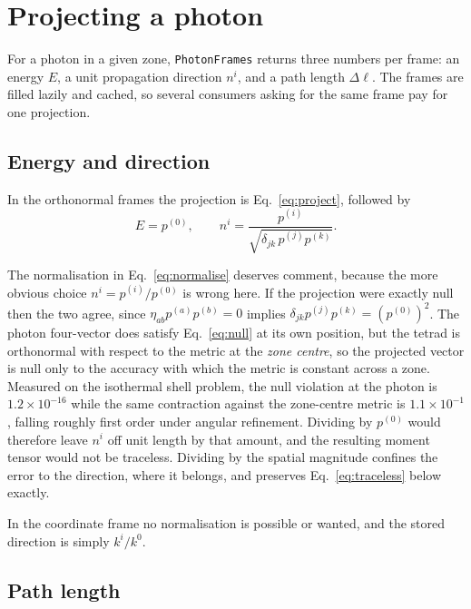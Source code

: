 \documentclass[11pt]{article}
\begin{document}
\section{Projecting a photon}
\label{sec:project}

For a photon in a given zone, \texttt{PhotonFrames} returns three numbers per frame: an
energy $E$, a unit propagation direction $n^i$, and a path length $\Delta \ell$. The
frames are filled lazily and cached, so several consumers asking for the same frame pay
for one projection.

\subsection{Energy and direction}

In the orthonormal frames the projection is Eq.~\eqref{eq:project}, followed by
\begin{equation}
  E = p^{(0)} , \qquad
  n^i = \frac{p^{(i)}}{\sqrt{\delta_{jk}\, p^{(j)} p^{(k)}}} .
  \label{eq:normalise}
\end{equation}

The normalisation in Eq.~\eqref{eq:normalise} deserves comment, because the more obvious
choice $n^i = p^{(i)}/p^{(0)}$ is wrong here. If the projection were exactly null then the
two agree, since $\eta_{ab} p^{(a)} p^{(b)} = 0$ implies
$\delta_{jk} p^{(j)} p^{(k)} = (p^{(0)})^2$. The photon four-vector does satisfy
Eq.~\eqref{eq:null} at its own position, but the tetrad is orthonormal with respect to the
metric at the \emph{zone centre}, so the projected vector is null only to the accuracy with
which the metric is constant across a zone. Measured on the isothermal shell problem, the
null violation at the photon is $1.2\times 10^{-16}$ while the same contraction against the
zone-centre metric is $1.1\times 10^{-1}$, falling roughly first order under angular
refinement. Dividing by $p^{(0)}$ would therefore leave $n^i$ off unit length by that
amount, and the resulting moment tensor would not be traceless. Dividing by the spatial
magnitude confines the error to the direction, where it belongs, and preserves
Eq.~\eqref{eq:traceless} below exactly.

In the coordinate frame no normalisation is possible or wanted, and the stored direction
is simply $k^i/k^0$.

\subsection{Path length}
\end{document}

